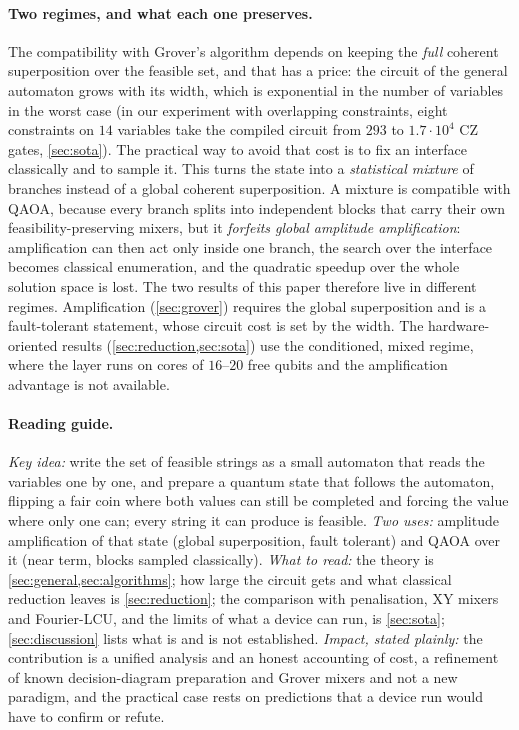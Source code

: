 \documentclass[10pt,twocolumn]{article}
\begin{document}
\paragraph{Two regimes, and what each one preserves.} The compatibility with Grover's algorithm depends on keeping the \emph{full} coherent superposition over the feasible set, and that has a price: the circuit of the general automaton grows with its width, which is exponential in the number of variables in the worst case (in our experiment with overlapping constraints, eight constraints on $14$ variables take the compiled circuit from $293$ to $1.7\cdot10^{4}$ CZ gates, \cref{sec:sota}). The practical way to avoid that cost is to fix an interface classically and to sample it. This turns the state into a \emph{statistical mixture} of branches instead of a global coherent superposition. A mixture is compatible with QAOA, because every branch splits into independent blocks that carry their own feasibility-preserving mixers, but it \emph{forfeits global amplitude amplification}: amplification can then act only inside one branch, the search over the interface becomes classical enumeration, and the quadratic speedup over the whole solution space is lost. The two results of this paper therefore live in different regimes. Amplification (\cref{sec:grover}) requires the global superposition and is a fault-tolerant statement, whose circuit cost is set by the width. The hardware-oriented results (\cref{sec:reduction,sec:sota}) use the conditioned, mixed regime, where the layer runs on cores of $16$--$20$ free qubits and the amplification advantage is not available.

\paragraph{Reading guide.} \emph{Key idea:} write the set of feasible strings as a small automaton that reads the variables one by one, and prepare a quantum state that follows the automaton, flipping a fair coin where both values can still be completed and forcing the value where only one can; every string it can produce is feasible. \emph{Two uses:} amplitude amplification of that state (global superposition, fault tolerant) and QAOA over it (near term, blocks sampled classically). \emph{What to read:} the theory is \cref{sec:general,sec:algorithms}; how large the circuit gets and what classical reduction leaves is \cref{sec:reduction}; the comparison with penalisation, XY mixers and Fourier-LCU, and the limits of what a device can run, is \cref{sec:sota}; \cref{sec:discussion} lists what is and is not established. \emph{Impact, stated plainly:} the contribution is a unified analysis and an honest accounting of cost, a refinement of known decision-diagram preparation and Grover mixers and not a new paradigm, and the practical case rests on predictions that a device run would have to confirm or refute.
\end{document}
